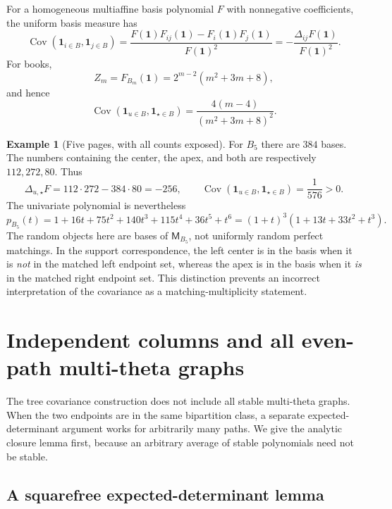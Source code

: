 \documentclass[11pt]{article}
\numberwithin{equation}{section}
\theoremstyle{definition}
\newtheorem{example}[theorem]{Example}%
\newcommand{\one}{\mathbf 1}
\newcommand{\Cov}{\operatorname{Cov}}
\newcommand{\del}{\Delta}
\begin{document}
For a homogeneous multiaffine basis polynomial $F$ with nonnegative
coefficients, the uniform basis measure has
\begin{equation}
 \Cov(\one_{i\in B},\one_{j\in B})
 =\frac{F(\one)F_{ij}(\one)-F_i(\one)F_j(\one)}{F(\one)^2}
 =-\frac{\del_{ij}F(\one)}{F(\one)^2}.
 \label{ade:eq:covrayleigh}
\end{equation}
For books,
\begin{equation}
 Z_m=F_{B_m}(\one)=2^{m-2}(m^2+3m+8),
 \label{ade:eq:bookZ}
\end{equation}
and hence
\begin{equation}
 \Cov(\one_{u\in B},\one_{\star\in B})
 =\frac{4(m-4)}{(m^2+3m+8)^2}.
 \label{ade:eq:bookcov}
\end{equation}

\begin{example}[Five pages, with all counts exposed]
For $B_5$ there are $384$ bases.  The numbers containing the center, the
apex, and both are respectively $112,272,80$.  Thus
\[
 \del_{u,\star}F=112\cdot272-384\cdot80=-256,
 \qquad
 \Cov(\one_{u\in B},\one_{\star\in B})=\frac1{576}>0.
\]
The univariate polynomial is nevertheless
\[
 p_{B_5}(t)=1+16t+75t^2+140t^3+115t^4+36t^5+t^6
           =(1+t)^3(1+13t+33t^2+t^3).
\]
The random objects here are bases of $\mathsf M_{B_5}$, not uniformly random
perfect matchings.  In the support correspondence, the left center is
in the basis when it is \emph{not} in the matched left endpoint set,
whereas the apex is in the basis when it \emph{is} in the matched right
endpoint set.  This distinction prevents an incorrect interpretation of
the covariance as a matching-multiplicity statement.
\end{example}

\section{Independent columns and all even-path multi-theta graphs}
\label{ade:sec:even}

The tree covariance construction does not include all stable multi-theta
graphs.  When the two endpoints are in the same bipartition class, a
separate expected-determinant argument works for arbitrarily many paths.
We give the analytic closure lemma first, because an arbitrary average of
stable polynomials need not be stable.

\subsection{A squarefree expected-determinant lemma}
\end{document}
